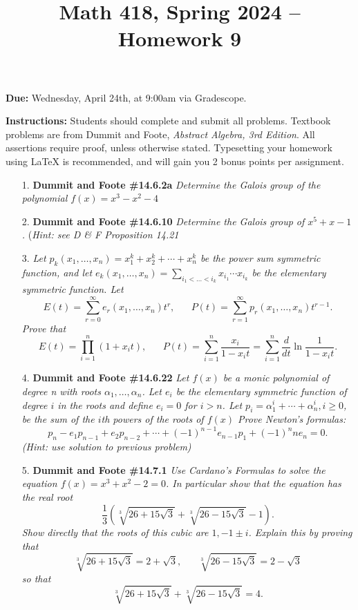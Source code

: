 \documentclass[12pt]{article}
\title{Math 418, Spring 2024 -- Homework 9}
\date{}
\begin{document}
 \maketitle
\vspace{-80pt}

\textbf{Due:} Wednesday, April 24th, at 9:00am via Gradescope.

\textbf{Instructions:} Students should complete and submit all problems. Textbook problems are from Dummit and Foote, \emph{Abstract Algebra, 3rd Edition}. All assertions require proof, unless otherwise stated. Typesetting your homework using LaTeX is recommended, and will gain you 2 bonus points per assignment.

\begin{enumerate}

\item[1.] \textbf{Dummit and Foote \#14.6.2a} \textit{Determine the Galois group of the polynomial $f(x) = x^3 - x^2 - 4$}

\item[2.] \textbf{Dummit and Foote \#14.6.10} \textit{Determine the Galois group of $x^5 + x - 1$.} (\emph{Hint: see D \& F Proposition 14.21}

\item[3.] \textit{Let $p_k(x_1,\ldots,x_n) = x_1^k + x_2^k + \cdots + x_n^k$ be the \emph{power sum symmetric function}, and let $e_k(x_1,\ldots,x_n) = \sum_{i_1<\ldots < i_k} x_{i_1}\cdots x_{i_k}$ be the elementary symmetric function. Let \[E(t) = \sum_{r=0}^\infty e_r(x_1,\ldots,x_n) t^r, \hspace{20pt} P(t) = \sum_{r=1}^\infty p_r(x_1,\ldots,x_n) t^{r-1}.\] Prove that \[E(t) = \prod_{i=1}^n (1+x_it), \hspace{20pt} P(t) = \sum_{i=1}^n \frac{x_i}{1-x_it} = \sum_{i=1}^n \frac{d}{dt} \ln\frac{1}{1-x_it}.\]}

\item[4.] \textbf{Dummit and Foote \#14.6.22} \textit{Let $f(x)$ be a monic polynomial of degree n with roots $\alpha_1,\ldots,\alpha_n$. Let $e_i$ be the elementary symmetric function of degree $i$ in the roots and define $e_i = 0$ for $i > n$. Let $p_i = \alpha_1^i + \cdots + \alpha_n^i, i\ge 0$, be the sum of the $i$th powers of the roots of $f(x)$ Prove Newton's formulas: \[p_n - e_1p_{n-1} + e_2p_{n-2} + \cdots + (-1)^{n-1}e_{n-1}p_1 + (-1)^n n e_n = 0.\]} \emph{(Hint: use solution to previous problem)}

\item[5.] \textbf{Dummit and Foote \#14.7.1} \textit{Use Cardano's Formulas to solve the equation $f(x) = x^3 + x^2 - 2 = 0$. In particular show that the equation has the real root \[\frac{1}{3}\left(\sqrt[3]{26 + 15\sqrt{3}} + \sqrt[3]{26 - 15\sqrt{3}} - 1\right).\] Show directly that the roots of this cubic are $1 , -1\pm i$. Explain this by proving that \[\sqrt[3]{26 + 15\sqrt{3}} = 2+\sqrt{3}, \hspace{20pt} \sqrt[3]{26 - 15\sqrt{3}} = 2-\sqrt{3}\] so that \[\sqrt[3]{26 + 15\sqrt{3}} + \sqrt[3]{26 - 15\sqrt{3}} = 4.\]}


\end{enumerate}
\end{document}
